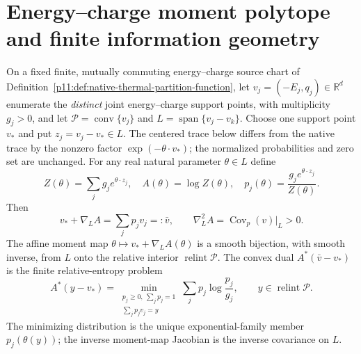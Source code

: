 \documentclass[12pt,a4paper]{article}
\begin{document}
\section{Energy--charge moment polytope and finite information geometry}
\label{p11:sec:cc15-energy-charge-information}
\begin{theorem}
\label{p11:thm:cc15-energy-charge-moment-map}
On a fixed finite, mutually commuting energy--charge source chart of
Definition~\ref{p11:def:native-thermal-partition-function}, let
$v_j=(-E_j,q_j)\in\mathbb R^d$ enumerate the \emph{distinct} joint
energy--charge support points, with multiplicity $g_j>0$, and let
$\mathcal P=\operatorname{conv}\{v_j\}$ and
$L=\operatorname{span}\{v_j-v_k\}$. Choose one support point $v_*$ and put $z_j=v_j-v_*\in L$.
The centered trace below differs from the native trace by the nonzero
factor $\exp(-\theta\cdot v_*)$; the normalized probabilities and
zero set are unchanged. For any real natural parameter $\theta\in L$ define
\[
 Z(\theta)=\sum_jg_je^{\theta\cdot z_j},\quad
 A(\theta)=\log Z(\theta),\quad
 p_j(\theta)=\frac{g_je^{\theta\cdot z_j}}{Z(\theta)}.
\]
Then
\[
 \boxed{v_*+\nabla_L A=\sum_jp_jv_j=:\bar v,
 \qquad \nabla_L^2 A=\operatorname{Cov}_{p}(v)|_L>0.}
\]
The affine moment map $\theta\mapsto v_*+\nabla_L A(\theta)$ is
a smooth bijection, with smooth inverse, from $L$ onto the relative
interior $\operatorname{relint}\mathcal P$.
The convex dual $A^*(\bar v-v_*)$ is the finite relative-entropy problem
\[
 \boxed{A^*(y-v_*)=\min_{\substack{p_j\ge0,\ \sum_jp_j=1\\
              \sum_jp_jv_j=y}}
       \sum_jp_j\log\frac{p_j}{g_j},\qquad
       y\in\operatorname{relint}\mathcal P.}
\]
The minimizing distribution is the unique exponential-family member
$p_j(\theta(y))$; the inverse moment-map Jacobian is the inverse
covariance on $L$.
\end{theorem}
\end{document}
